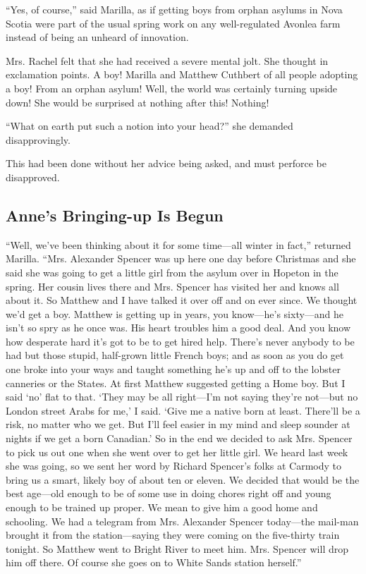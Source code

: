 \documentclass{article}
\begin{document}
``Yes, of course,'' said Marilla, as if getting boys from orphan asylums in Nova Scotia were part of the usual spring work on any well-regulated Avonlea farm instead of being an unheard of innovation.

Mrs. Rachel felt that she had received a severe mental jolt. She thought in exclamation points. A boy! Marilla and Matthew Cuthbert of all people adopting a boy! From an orphan asylum! Well, the world was certainly turning upside down! She would be surprised at nothing after this! Nothing!

``What on earth put such a notion into your head?'' she demanded disapprovingly.

This had been done without her advice being asked, and must perforce be disapproved.

\subsection{Anne's Bringing-up Is Begun}
``Well, we've been thinking about it for some time---all winter in fact,'' returned Marilla. ``Mrs. Alexander Spencer was up here one day before Christmas and she said she was going to get a little girl from the asylum over in Hopeton in the spring. Her cousin lives there and Mrs. Spencer has visited her and knows all about it. So Matthew and I have talked it over off and on ever since. We thought we'd get a boy. Matthew is getting up in years, you know---he's sixty---and he isn't so spry as he once was. His heart troubles him a good deal. And you know how desperate hard it's got to be to get hired help. There's never anybody to be had but those stupid, half-grown little French boys; and as soon as you do get one broke into your ways and taught something he's up and off to the lobster canneries or the States. At first Matthew suggested getting a Home boy. But I said `no' flat to that. `They may be all right---I'm not saying they're not---but no London street Arabs for me,' I said. `Give me a native born at least. There'll be a risk, no matter who we get. But I'll feel easier in my mind and sleep sounder at nights if we get a born Canadian.' So in the end we decided to ask Mrs. Spencer to pick us out one when she went over to get her little girl. We heard last week she was going, so we sent her word by Richard Spencer's folks at Carmody to bring us a smart, likely boy of about ten or eleven. We decided that would be the best age---old enough to be of some use in doing chores right off and young enough to be trained up proper. We mean to give him a good home and schooling. We had a telegram from Mrs. Alexander Spencer today---the mail-man brought it from the station---saying they were coming on the five-thirty train tonight. So Matthew went to Bright River to meet him. Mrs. Spencer will drop him off there. Of course she goes on to White Sands station herself.''
\end{document}
